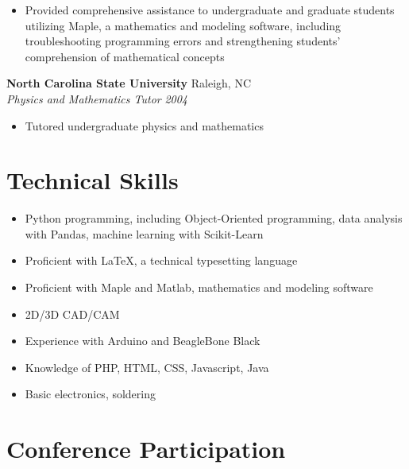 \documentclass[10pt]{article}
\begin{document}
\begin{itemize}

\item	Provided comprehensive assistance to undergraduate and graduate
students utilizing Maple, a mathematics and modeling software, including
troubleshooting programming errors and strengthening students’ comprehension
of mathematical concepts

\end{itemize}


\noindent
{\bf North Carolina State University} \hfill Raleigh, NC\\
{\it Physics and Mathematics Tutor} \hfill {\it 2004}

\begin{itemize}

\item	Tutored undergraduate physics and mathematics

\end{itemize}


\section*{Technical Skills}

\begin{itemize}
\item Python programming, including Object-Oriented programming, data analysis
with Pandas, machine learning with Scikit-Learn

\item	Proficient with {\rmfamily \LaTeX}, a technical typesetting language

\item Proficient with Maple and Matlab, mathematics and modeling software

\item	2D/3D CAD/CAM

\item	Experience with Arduino and BeagleBone Black

\item	Knowledge of PHP, HTML, CSS, Javascript, Java

\item	Basic electronics, soldering

\end{itemize}


\section*{Conference Participation}
\end{document}
